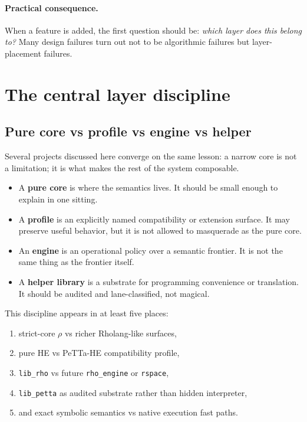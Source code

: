 \documentclass[11pt]{article}
\begin{document}
\paragraph{Practical consequence.}
When a feature is added, the first question should be: \emph{which layer does this belong to?} Many design failures turn out not to be algorithmic failures but layer-placement failures.

\section{The central layer discipline}

\subsection{Pure core vs profile vs engine vs helper}

Several projects discussed here converge on the same lesson: a narrow core is not a limitation; it is what makes the rest of the system composable.

\begin{itemize}
    \item A \textbf{pure core} is where the semantics lives. It should be small enough to explain in one sitting.
    \item A \textbf{profile} is an explicitly named compatibility or extension surface. It may preserve useful behavior, but it is not allowed to masquerade as the pure core.
    \item An \textbf{engine} is an operational policy over a semantic frontier. It is not the same thing as the frontier itself.
    \item A \textbf{helper library} is a substrate for programming convenience or translation. It should be audited and lane-classified, not magical.
\end{itemize}

This discipline appears in at least five places:
\begin{enumerate}
    \item strict-core $\rho$ vs richer Rholang-like surfaces,
    \item pure HE vs PeTTa-HE compatibility profile,
    \item \texttt{lib\_rho} vs future \texttt{rho\_engine} or \texttt{rspace},
    \item \texttt{lib\_petta} as audited substrate rather than hidden interpreter,
    \item and exact symbolic semantics vs native execution fast paths.
\end{enumerate}
\end{document}
